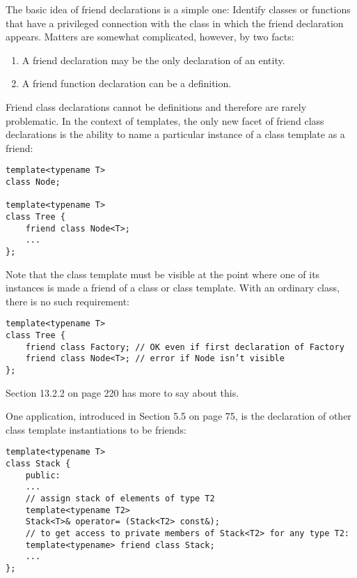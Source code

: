 
The basic idea of friend declarations is a simple one: Identify classes or functions that have a privileged connection with the class in which the friend declaration appears. Matters are somewhat complicated, however, by two facts:

\begin{enumerate}
\item 
A friend declaration may be the only declaration of an entity.

\item 
A friend function declaration can be a definition.
\end{enumerate}


Friend class declarations cannot be definitions and therefore are rarely problematic. In the context of templates, the only new facet of friend class declarations is the ability to name a particular instance of a class template as a friend:

\begin{lstlisting}[style=styleCXX]
template<typename T>
class Node;

template<typename T>
class Tree {
	friend class Node<T>;
	...
};
\end{lstlisting}

Note that the class template must be visible at the point where one of its instances is made a friend of a class or class template. With an ordinary class, there is no such requirement:

\begin{lstlisting}[style=styleCXX]
template<typename T>
class Tree {
	friend class Factory; // OK even if first declaration of Factory
	friend class Node<T>; // error if Node isn’t visible
};
\end{lstlisting}

Section 13.2.2 on page 220 has more to say about this.

One application, introduced in Section 5.5 on page 75, is the declaration of other class template instantiations to be friends:

\begin{lstlisting}[style=styleCXX]
template<typename T>
class Stack {
	public:
	...
	// assign stack of elements of type T2
	template<typename T2>
	Stack<T>& operator= (Stack<T2> const&);
	// to get access to private members of Stack<T2> for any type T2:
	template<typename> friend class Stack;
	...
};
\end{lstlisting}

